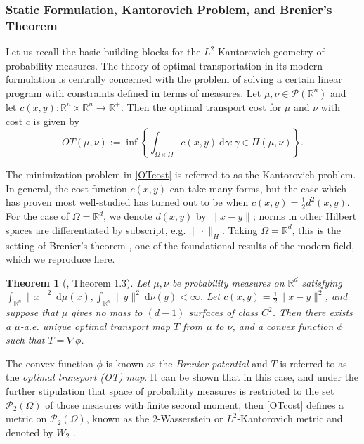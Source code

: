 \documentclass{article}
\newtheorem{theorem}{Theorem}
\newcommand{\R}{\mathbb{R}}
\newcommand{\diff}{\:\mathrm{d}}
\begin{document}
\subsubsection{Static Formulation, Kantorovich Problem, and Brenier's Theorem}
Let us recall the basic building blocks for the \(L^2\)-Kantorovich geometry of probability measures. The theory of optimal transportation in its modern formulation is centrally concerned with the problem of solving a certain linear program with constraints defined in terms of measures. Let \(\mu, \nu \in \mathcal{P}(\R^n)\) and let \(c(x,y): \R^n \times \R^n \to \R^+\). Then the optimal transport cost for \(\mu\) and \(\nu\) with cost \(c\) is given by
\begin{equation}
\label{OTcost}
  OT(\mu,\nu) := \inf\left\{ \int_{\Omega\times\Omega}c(x,y) \diff\gamma : \gamma \in \Pi(\mu, \nu) \right\}.
\end{equation}

The minimization problem in \eqref{OTcost} is referred to as the Kantorovich problem. In general, the cost function \(c(x,y)\) can take many forms, but the case which has proven most well-studied has turned out to be when \(c(x,y) = \frac{1}{2}d^2(x,y)\).  For the case of \(\Omega = \R^d\), we denote \(d(x,y)\) by \(\|x - y\|\); norms in other Hilbert spaces are differentiated by subscript, e.g. \(\|\cdot\|_H.\) Taking \(\Omega = \R^d\), this is the setting of Brenier's theorem \cite{brenierPolarFactorizationMonotone1991}, one of the foundational results of the modern field, which we reproduce here.

\begin{theorem}[\cite{brenierPolarFactorizationMonotone1991}, Theorem 1.3]
  \label{Brenier}
Let \(\mu, \nu\) be probability measures on \(\R^d\) satisfying \linebreak \(\int_{\R^n} \|x\|^2 \diff \mu(x), \int_{\R^n}\|y\|^2 \diff\nu(y) < \infty\). Let \(c(x,y) = \frac{1}{2}\|x-y\|^2\), and suppose that \(\mu\) gives no mass to \((d-1)\) surfaces of class \(C^2\). Then there exists a \(\mu\)-a.e. unique optimal transport map \(T\) from \(\mu\) to \(\nu\), and a convex function \(\phi\) such that \(T = \nabla\phi\).
\end{theorem}

The convex function \(\phi\) is known as the \emph{Brenier potential} and \(T\) is referred to as the \emph{optimal transport (OT) map}. It can be shown that in this case, and under the further stipulation that space of probability measures is restricted to the set \(\mathcal{P}_2(\Omega)\) of those measures with finite second moment, then \eqref{OTcost} defines a metric on \(\mathcal{P}_2(\Omega)\), known as the \(2\)-Wasserstein or \(L^2\)-Kantorovich metric and denoted by \(W_2\) \cite{santambrogioOptimalTransportApplied2015}.
\end{document}
